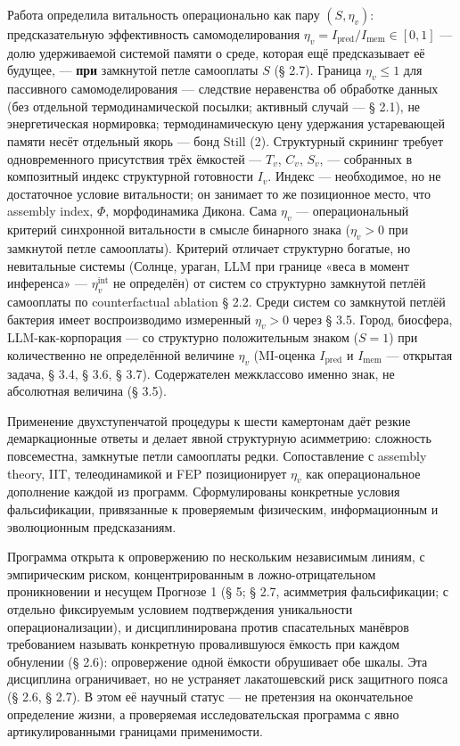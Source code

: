 \documentclass[pdflatex,sn-mathphys-ay]{sn-jnl}
\begin{document}
Работа определила витальность операционально как пару \((S, \eta_v)\): предсказательную эффективность самомоделирования \(\eta_v = I_{\text{pred}} / I_{\text{mem}} \in [0,1]\) --- долю удерживаемой системой памяти о среде, которая ещё предсказывает её будущее, --- \textbf{при} замкнутой петле самооплаты \(S\) (§ 2.7). Граница \(\eta_v \le 1\) для пассивного самомоделирования --- следствие неравенства об обработке данных (без отдельной термодинамической посылки; активный случай --- § 2.1), не энергетическая нормировка; термодинамическую цену удержания устаревающей памяти несёт отдельный якорь --- бонд Still (2). Структурный скрининг требует одновременного присутствия трёх ёмкостей --- \(T_v\), \(C_v\), \(S_v\), --- собранных в композитный индекс структурной готовности \(I_v\). Индекс --- необходимое, но не достаточное условие витальности; он занимает то же позиционное место, что assembly index, \(\Phi\), морфодинамика Дикона. Сама \(\eta_v\) --- операциональный критерий синхронной витальности в смысле бинарного знака (\(\eta_v > 0\) при замкнутой петле самооплаты). Критерий отличает структурно богатые, но невитальные системы (Солнце, ураган, LLM при границе «веса в момент инференса» --- \(\eta_v^{\text{int}}\) не определён) от систем со структурно замкнутой петлёй самооплаты по counterfactual ablation § 2.2. Среди систем со замкнутой петлёй бактерия имеет воспроизводимо измеренный \(\eta_v > 0\) через § 3.5. Город, биосфера, LLM-как-корпорация --- со структурно положительным знаком (\(S = 1\)) при количественно не определённой величине \(\eta_v\) (MI-оценка \(I_{\text{pred}}\) и \(I_{\text{mem}}\) --- открытая задача, § 3.4, § 3.6, § 3.7). Содержателен межклассово именно знак, не абсолютная величина (§ 3.5).

Применение двухступенчатой процедуры к шести камертонам даёт резкие демаркационные ответы и делает явной структурную асимметрию: сложность повсеместна, замкнутые петли самооплаты редки. Сопоставление с assembly theory, IIT, телеодинамикой и FEP позиционирует \(\eta_v\) как операциональное дополнение каждой из программ. Сформулированы конкретные условия фальсификации, привязанные к проверяемым физическим, информационным и эволюционным предсказаниям.

Программа открыта к опровержению по нескольким независимым линиям, с эмпирическим риском, концентрированным в ложно-отрицательном проникновении и несущем Прогнозе 1 (§ 5; § 2.7, асимметрия фальсификации; с отдельно фиксируемым условием подтверждения уникальности операционализации), и дисциплинирована против спасательных манёвров требованием называть конкретную провалившуюся ёмкость при каждом обнулении (§ 2.6): опровержение одной ёмкости обрушивает обе шкалы. Эта дисциплина ограничивает, но не устраняет лакатошевский риск защитного пояса (§ 2.6, § 2.7). В этом её научный статус --- не претензия на окончательное определение жизни, а проверяемая исследовательская программа с явно артикулированными границами применимости.
\end{document}
